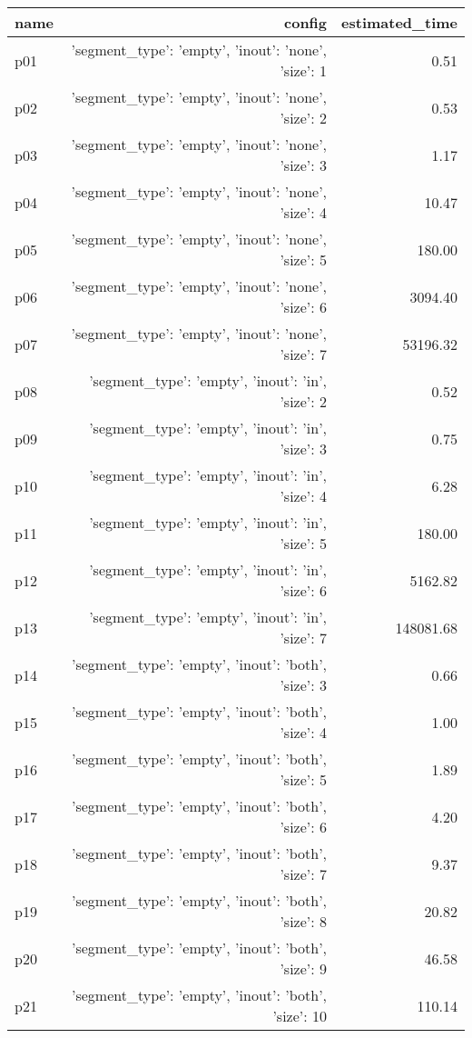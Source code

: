 \documentclass{article}
\begin{document}
                            \begin{center}
                            \scriptsize
                            \begin{tabular}{@{}l|r|r@{}}
                            name & config & estimated\_time\\\midrule
                              p01&{'segment\_type': 'empty', 'inout': 'none', 'size': 1}&0.51\\
  p02&{'segment\_type': 'empty', 'inout': 'none', 'size': 2}&0.53\\
  p03&{'segment\_type': 'empty', 'inout': 'none', 'size': 3}&1.17\\
  p04&{'segment\_type': 'empty', 'inout': 'none', 'size': 4}&10.47\\
  p05&{'segment\_type': 'empty', 'inout': 'none', 'size': 5}&180.00\\
  p06&{'segment\_type': 'empty', 'inout': 'none', 'size': 6}&3094.40\\
  p07&{'segment\_type': 'empty', 'inout': 'none', 'size': 7}&53196.32\\
  p08&{'segment\_type': 'empty', 'inout': 'in', 'size': 2}&0.52\\
  p09&{'segment\_type': 'empty', 'inout': 'in', 'size': 3}&0.75\\
  p10&{'segment\_type': 'empty', 'inout': 'in', 'size': 4}&6.28\\
  p11&{'segment\_type': 'empty', 'inout': 'in', 'size': 5}&180.00\\
  p12&{'segment\_type': 'empty', 'inout': 'in', 'size': 6}&5162.82\\
  p13&{'segment\_type': 'empty', 'inout': 'in', 'size': 7}&148081.68\\
  p14&{'segment\_type': 'empty', 'inout': 'both', 'size': 3}&0.66\\
  p15&{'segment\_type': 'empty', 'inout': 'both', 'size': 4}&1.00\\
  p16&{'segment\_type': 'empty', 'inout': 'both', 'size': 5}&1.89\\
  p17&{'segment\_type': 'empty', 'inout': 'both', 'size': 6}&4.20\\
  p18&{'segment\_type': 'empty', 'inout': 'both', 'size': 7}&9.37\\
  p19&{'segment\_type': 'empty', 'inout': 'both', 'size': 8}&20.82\\
  p20&{'segment\_type': 'empty', 'inout': 'both', 'size': 9}&46.58\\
  p21&{'segment\_type': 'empty', 'inout': 'both', 'size': 10}&110.14\\

\end{tabular}
\end{center}
\end{document}
